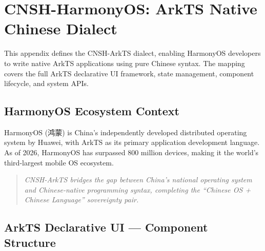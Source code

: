 
\section{CNSH-HarmonyOS: ArkTS Native Chinese Dialect}
\label{app:harmonyos}

This appendix defines the CNSH-ArkTS dialect, enabling HarmonyOS
developers to write native ArkTS applications using pure Chinese syntax.
The mapping covers the full ArkTS declarative UI framework, state
management, component lifecycle, and system APIs.

\subsection{HarmonyOS Ecosystem Context}

HarmonyOS (鸿蒙) is China's independently developed distributed
operating system by Huawei, with ArkTS as its primary application
development language. As of 2026, HarmonyOS has surpassed 800 million
devices, making it the world's third-largest mobile OS ecosystem.

\begin{quote}
\itshape
CNSH-ArkTS bridges the gap between China's national operating system
and Chinese-native programming syntax, completing the
``Chinese OS + Chinese Language'' sovereignty pair.
\end{quote}

\subsection{ArkTS Declarative UI — Component Structure}

